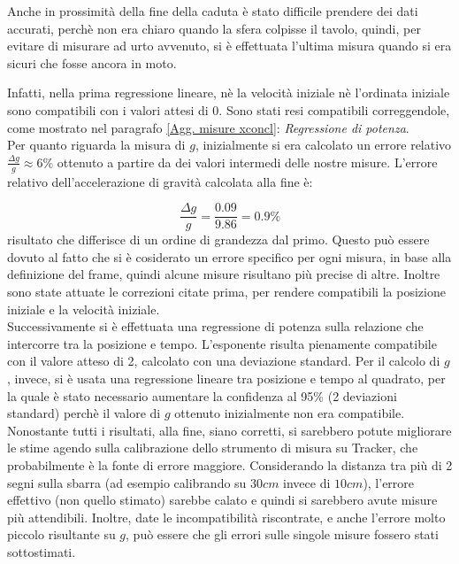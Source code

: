 \documentclass[12pt, a4paper]{article}
\begin{document}
Anche in prossimità della fine della caduta è stato difficile prendere dei dati accurati, perchè non era chiaro quando la sfera colpisse il tavolo, quindi, per evitare di misurare ad urto avvenuto, si è effettuata l'ultima misura quando si era sicuri che fosse ancora in moto.

Infatti, nella prima regressione lineare, nè la velocità iniziale nè l'ordinata iniziale sono compatibili con i valori attesi di 0. Sono stati resi compatibili correggendole, come mostrato nel paragrafo \ref{Agg. misure xconcl}: \textit{Regressione di potenza}.\\

Per quanto riguarda la misura di $g$, inizialmente si era calcolato un errore relativo $\frac{\Delta g}{g}\approx 6\% $ ottenuto a partire da dei valori intermedi delle nostre misure. L'errore relativo dell'accelerazione di gravità calcolata alla fine è:

\begin{equation*}
    \frac{\Delta g}{g}=\frac{0.09}{9.86}=0.9\%
\end{equation*}
risultato che differisce di un ordine di grandezza dal primo. Questo può essere dovuto al fatto che si è cosiderato un errore specifico per ogni misura, in base alla definizione del frame, quindi alcune misure risultano più precise di altre. Inoltre sono state attuate le correzioni citate prima, per rendere compatibili  la posizione iniziale e la velocità iniziale. \\


Successivamente si è effettuata una regressione di potenza sulla relazione che intercorre tra la posizione e tempo. L'esponente risulta pienamente compatibile con il valore atteso di 2, calcolato con una deviazione standard.
Per il calcolo di $g$, invece, si è usata una regressione lineare tra posizione e tempo al quadrato, per la quale è stato necessario aumentare la confidenza al 95\% (2 deviazioni standard) perchè il valore di $g$ ottenuto inizialmente non era compatibile. \\

Nonostante tutti i risultati, alla fine, siano corretti, si sarebbero potute migliorare le stime agendo sulla calibrazione dello strumento di misura su Tracker, che  probabilmente è la fonte di errore maggiore. Considerando la distanza tra più di 2 segni sulla sbarra (ad esempio calibrando su $30cm$ invece di $10cm$), l'errore effettivo (non quello stimato) sarebbe calato e quindi si sarebbero avute misure più attendibili.
Inoltre, date le incompatibilità riscontrate, e anche l'errore molto piccolo risultante su $g$, può essere che gli errori sulle singole misure fossero stati sottostimati.
\end{document}
